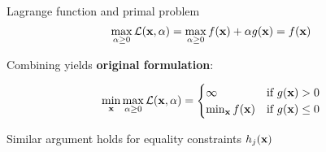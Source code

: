 \documentclass[11pt,compress,t,notes=noshow, xcolor=table]{beamer}
\begin{document}
\begin{vbframe}{Lagrange function and primal problem}
\begin{equation*}
	\max_{\alpha \ge 0} \mathcal{L}(\mathbf{x}, \alpha) = \max_{\alpha \ge 0} f(\mathbf{x}) +  \alpha g(\mathbf{x}) = f(\mathbf{x})
\end{equation*}

\medskip

Combining yields \textbf{original formulation}:

\begin{equation*}
	\min_{\mathbf{x}} \max_{\alpha \ge 0} \mathcal{L}(\mathbf{x}, \alpha) =
    \begin{cases}
        \infty & \text{if } g(\mathbf{x}) > 0 \\
        \min_{\mathbf{x}} f(\mathbf{x}) & \text{if }  g(\mathbf{x}) \le 0
    \end{cases}
\end{equation*}

Similar argument holds for equality constraints $h_j(\mathbf{x})$

\end{vbframe}
\end{document}
